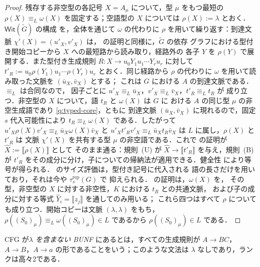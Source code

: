 \documentclass[11pt,a4paper]{ltjsarticle}
\numberwithin{equation}{section}
\theoremstyle{plain}
\theoremstyle{definition}
\theoremstyle{remark}
\theoremstyle{plain}
\newcommand{\WitnessSet}{\mathsf{Wit}}
\newcommand{\NT}[1]{\llbracket #1\rrbracket}
\begin{document}
\begin{proof}
残存する非空型の各記号 $X=A_\mu$ について，型 $\mu$ をもつ最短の
$\rho(X)\equiv_L\omega(X)$ を固定する；空語型の $X$ については
$\rho(X):=\lambda$ とおく．$\WitnessSet(\widetilde G)$ の構成
\cite[\S5.1，式~(2)]{kuriyamaCFG} を，全体を通じて $\omega$ の代わりに
$\rho$ を用いて繰り返す：到達文脈 $\chi'(X)=(u'_X,v'_X)$ は，
\cite[補題~6.2]{kuriyamaCFG} の証明と同様に，$\widetilde G$ の依存
グラフにおける型付き開始コピーから $X$ への最短路から読み取り，経路外の
各子 $Y$ を $\rho(Y)$ で展開する．また型付き生成規則
$R:X\to u_0Y_1u_1\cdots Y_ru_r$ に対して
$t'_R:=u_0\rho(Y_1)u_1\cdots\rho(Y_r)u_r$ とおく．同じ経路から
$\rho$ の代わりに $\omega$ を用いて読み取った文脈を $(\bar u_X,\bar v_X)$ とする；
これは $G$ における $A$ の到達文脈である．$\equiv_L$ は合同なので，
因子ごとに $u'_X\equiv_L\bar u_X$，$v'_X\equiv_L\bar v_X$，$t'_R\equiv_Lt_R$ が
成り立つ．非空型の $X$ について，語 $t_R$ と $\omega(X)$ は $G$ に
おける $A$ の同じ型 $\mu$ の非空生成語であり \ref{q:typed-core}，ともに
到達文脈 $(\bar u_X,\bar v_X)$ に現れるので，固定 $s$ 代入可能性により
$t_R\equiv_L\omega(X)$ である．したがって
$u'_X\rho(X)v'_X\equiv_L\bar u_X\omega(X)\bar v_X$ と
$u'_Xt'_Rv'_X\equiv_L\bar u_Xt_R\bar v_X$ は $L$ に属し，$\rho(X)$ と $t'_R$ は
文脈 $\chi'(X)$ を共有する型 $\mu$ の非空語である．これで
\cite[定理~5.2]{kuriyamaCFG} の証明が $\widehat X:=\NT{\rho(X)}$ として
そのまま通る：規則~(U) が $\widehat X\to\NT{t'_R}$ を与え，規則~(B) が
$t'_R$ をその成分に分け，子についての帰納法が適用できる．健全性
\cite[定理~4.2]{kuriyamaCFG} により等号が得られる．
\cite[補題~6.2]{kuriyamaCFG} のサイズ評価は，型付き記号に代入される
語の長さだけを用いており，それは今や $\tau^{\mathrm{rep}}_s(G)$ で
抑えられる．\cite[定理~5.2]{kuriyamaCFG} の証明は，$\omega(X)$ を，
その型，非空型の $X$ に対する非空性，$K$ における $t_R$ との共通文脈，
および子の成分に対する等式 $\widehat Y_i=\NT{z_j}$ を通してのみ用いる；
これら四つはすべて $\rho$ についても成り立つ．開始コピーは文脈
$(\lambda,\lambda)$ をもち，
$\rho((S_0)_\mu)\equiv_L\omega((S_0)_\mu)\in L$ であるから
$\rho((S_0)_\mu)\in L$ である．
\end{proof}

CFG が\emph{$\lambda$ を含まない BUNF} にあるとは，すべての生成規則が
$A\to BC$，$A\to B$，$A\to a$ の形であることをいう；このような文法は
$\lambda$ なしであり，ランクは高々2である．
\end{document}
